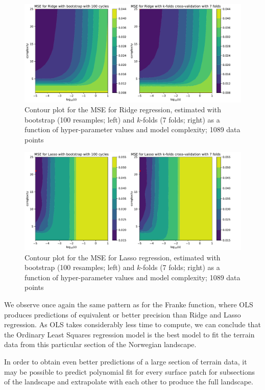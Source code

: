 \documentclass[10pt, a4paper]{article}
\begin{document}
    \begin{figure}[h] %
        \centering
        \includegraphics[scale=0.5]{ex6_bs_bcs_100_cv_k_folds_7_n_lmd_50_ridge.pdf}
        \caption{Contour plot for the MSE for Ridge regression, estimated with bootstrap (100 resamples; left) and $k$-folds (7 folds; right) as a function of hyper-parameter values and model complexity; 1089 data points}
        \label{fig:ex6-bvridge}
    \end{figure}

    \begin{figure}[h] %
        \centering
        \includegraphics[scale=0.5]{ex6_bs_bcs_100_cv_k_folds_7_n_lmd_50_lasso.pdf}
        \caption{Contour plot for the MSE for Lasso regression, estimated with bootstrap (100 resamples; left) and $k$-folds (7 folds; right) as a function of hyper-parameter values and model complexity; 1089 data points}
        \label{fig:ex6-bvlasso}
    \end{figure}
    
    We observe once again the same pattern as for the Franke function, where OLS produces predictions of equivalent or better precision than Ridge and Lasso regression. As OLS takes considerably less time to compute, we can conclude that the Ordinary Least Squares regression model is the best model to fit the terrain data from this particular section of the Norwegian landscape.
    
    In order to obtain even better predictions of a large section of terrain data, it may be possible to predict polynomial fit for every surface patch for subsections of the landscape and extrapolate with each other to produce the full landscape.

\clearpage



\end{document}
